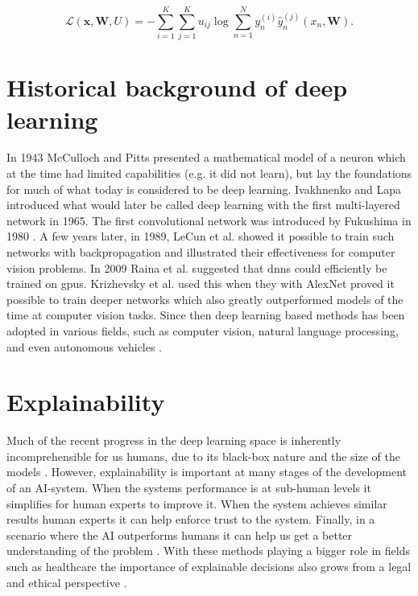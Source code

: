\begin{equation}
    \mathcal{L}(\pmb{x}, \pmb{W}, U) = - \sum_{i=1}^K \sum_{j=1}^K u_{ij} \log \sum_{n=1}^N y_n^{(i)} \hat{y}_n^{(j)}(x_n, \pmb{W}).
    \label{eq:confusion-entropy}
\end{equation}
%
%


\section{Historical background of deep learning} \label{sec:dl-history}
In 1943 McCulloch and Pitts \cite{McCulloch1943} presented a mathematical model of a neuron which at the time had limited capabilities (e.g. it did not learn), but lay the foundations for much of what today is considered to be deep learning. Ivakhnenko and Lapa \cite{Ivakhnenko1965} introduced what would later be called deep learning with the first multi-layered network in 1965. The first convolutional network was introduced by Fukushima in 1980 \cite{Fukushima1980}. A few years later, in 1989, LeCun et al. \cite{LeCun1989} showed it possible to train such networks with backpropagation and illustrated their effectiveness for computer vision problems. In 2009 Raina et al. \cite{Raina2009} suggested that \glspl{dnn} could efficiently be trained on \glspl{gpu}. Krizhevsky et al. \cite{Krizhevsky2012} used this when they with AlexNet proved it possible to train deeper networks which also greatly outperformed models of the time at computer vision tasks. Since then deep learning based methods has been adopted in various fields, such as computer vision, natural language processing, and even autonomous vehicles \cite{NazmusSaadat2020}.

\section{Explainability} \label{sec:explainability}
Much of the recent progress in the deep learning space is inherently incomprehensible for us humans, due to its black-box nature and the size of the models \cite{Du2018}. However, explainability is important at many stages of the development of an AI-system. When the systems performance is at sub-human levels it simplifies for human experts to improve it. When the system achieves similar results human experts it can help enforce trust to the system. Finally, in a scenario where the AI outperforms humans it can help us get a better understanding of the problem \cite{Selvaraju2016}. With these methods playing a bigger role in fields such as healthcare the importance of explainable decisions also grows from a legal and ethical perspective \cite{Amann2020}.

